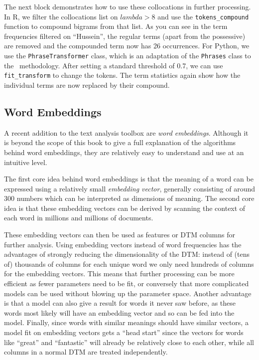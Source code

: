 The next block demonstrates how to use these collocations in further processing.
In R, we filter the collocations list on $lambda>8$ and use the \texttt{tokens\_compound} function to compound bigrams from that list.
As you can see in the term frequencies filtered on ``Hussein'', the regular terms (apart from the possessive) are removed and the compounded term now has 26 occurrences.
For Python, we use the \texttt{PhraseTransformer} class, which is an adaptation of the \texttt{Phrases} class to the \sklearn\ methodology.
After setting a standard threshold of 0.7, we can use \texttt{fit\_transform} to change the tokens.
The term statistics again show how the individual terms are now replaced by their compound.


\subsection{Word Embeddings} \label{sec:wordembeddings}

A recent addition to the text analysis toolbox are \emph{word embeddings}.
Although it is beyond the scope of this book to give a full explanation of the algorithms behind word embeddings,
they are relatively easy to understand and use at an intuitive level.

The first core idea behind word embeddings is that the meaning of a word can be expressed using a relatively small \emph{embedding vector}, generally consisting of around 300 numbers which can be interpreted as dimensions of meaning.
The second core idea is that these embedding vectors can be derived by scanning the context of each word in millions and millions of documents.


These embedding vectors can then be used as features or DTM columns for further analysis.
Using embedding vectors instead of word frequencies has the advantages of strongly reducing the dimensionality of the DTM:
instead of (tens of) thousands of columns for each unique word we only need hundreds of columns for the embedding vectors.
This means that further processing can be more efficient as fewer parameters need to be fit,
or conversely that more complicated models can be used without blowing up the parameter space.
Another advantage is that a model can also give a result for words it never saw before, as these words most likely will have an embedding vector and so can be fed into the model.
Finally, since words with similar meanings should have similar vectors,
a model fit on embedding vectors gets a ``head start'' since the vectors for words like ``great'' and ``fantastic'' will already be relatively close to each other, while all columns in a normal DTM are treated independently.

